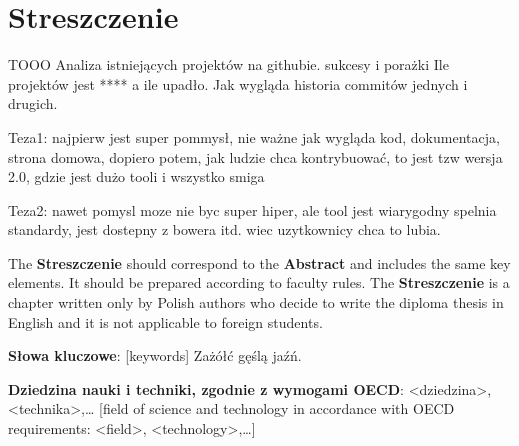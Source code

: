 \chapter*{Streszczenie}

TOOO
Analiza istniejących projektów na githubie. sukcesy i porażki
Ile projektów jest **** a ile upadło.
Jak wygląda historia commitów jednych i drugich.

Teza1: najpierw jest super pommysł, nie ważne jak wygląda kod, dokumentacja, strona domowa, dopiero potem, jak ludzie chca kontrybuować, to jest tzw wersja 2.0, gdzie jest dużo tooli i wszystko smiga

Teza2: nawet pomysl moze nie byc super hiper, ale tool jest wiarygodny spelnia standardy, jest dostepny z bowera itd. wiec uzytkownicy chca to lubia.


The \textbf{Streszczenie} should correspond to the \textbf{Abstract} and includes the same key elements. It  should be prepared according to faculty rules. The \textbf{Streszczenie} is a chapter written only by Polish authors who decide to write the diploma thesis in English and it is not applicable to foreign students. 

\vspace{12pt}
\noindent\textbf{Słowa kluczowe}: [keywords] Zażółć gęślą jaźń.

\vspace{12pt}
\noindent\textbf{Dziedzina nauki i techniki, zgodnie z wymogami OECD}: \textless{}dziedzina\textgreater{}, \textless{}technika\textgreater{},\ldots
[field of science and technology in accordance with OECD requirements: \textless{}field\textgreater{}, \textless{}technology\textgreater{},\ldots]